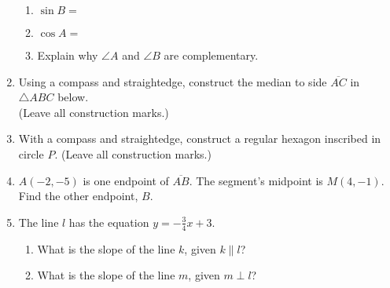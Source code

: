 \documentclass[12pt, twoside]{article}
\begin{document}
\begin{enumerate}
\begin{multicols}{2}
          \begin{enumerate}
          \item $\sin B =$ \vspace{0.75cm}
          \item $\cos A =$ \vspace{0.75cm}
          \item Explain why $\angle A$ and $\angle B$ are complementary.
        \end{enumerate}
    \end{multicols}

\newpage

    \item Using  a  compass  and  straightedge,  construct  the  median  to  side $\overline{AC}$ in $\triangle ABC$ below.\\ (Leave all construction marks.)
      \vspace{1cm}
    \begin{center}
    \end{center}

      \vspace{2cm}

    \item With a compass and straightedge, construct a regular hexagon inscribed in circle $P$. (Leave all construction marks.)
      \vspace{1cm}
      \begin{center}
      \end{center}

\newpage

    \item $A(-2,-5)$ is one endpoint of $\overline{AB}$. The segment's midpoint is $M(4,-1)$. Find the other endpoint, $B$. \vspace{5cm}

    \item The line $l$ has the equation $y=-\frac{3}{4} x+3$.
      \begin{enumerate}
        \item What is the slope of the line $k$, given $k \parallel l$?
        \vspace{1.5cm}
        \item What is the slope of the line $m$, given $m \perp l$?
        \vspace{2.5cm}
      \end{enumerate}


\end{enumerate}
\end{document}
